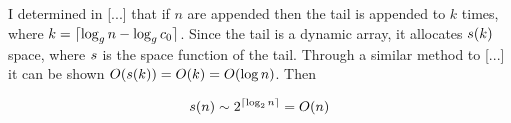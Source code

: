 I determined in [...] that if $n$ are appended then the tail is appended to $k$ times, where $k = \lceil \log_{g} n - \log_{g} c_0 \rceil$. Since the tail is a dynamic array, it allocates $s(k)$ space, where $s$ is the space function of the tail. Through a similar method to [...] it can be shown $O(s(k)) = O(k) = O(\log n)$. Then %

\begin{align*}
s(n) \sim 2^{\lceil \log_2 n \rceil} = O(n)
\end{align*}